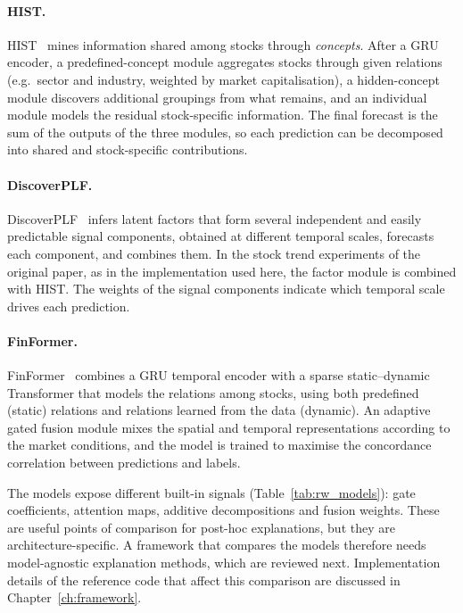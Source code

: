 \paragraph{HIST.} HIST~\cite{xu2021hist} mines information shared among stocks through \emph{concepts}. After a GRU encoder, a predefined-concept module aggregates stocks through given relations (e.g.\ sector and industry, weighted by market capitalisation), a hidden-concept module discovers additional groupings from what remains, and an individual module models the residual stock-specific information. The final forecast is the sum of the outputs of the three modules, so each prediction can be decomposed into shared and stock-specific contributions.

\paragraph{DiscoverPLF.} DiscoverPLF~\cite{hou2024discovering} infers latent factors that form several independent and easily predictable signal components, obtained at different temporal scales, forecasts each component, and combines them. In the stock trend experiments of the original paper, as in the implementation used here, the factor module is combined with HIST. The weights of the signal components indicate which temporal scale drives each prediction.

\paragraph{FinFormer.} FinFormer~\cite{zu2023finformer} combines a GRU temporal encoder with a sparse static--dynamic Transformer that models the relations among stocks, using both predefined (static) relations and relations learned from the data (dynamic). An adaptive gated fusion module mixes the spatial and temporal representations according to the market conditions, and the model is trained to maximise the concordance correlation between predictions and labels.

The models expose different built-in signals (Table~\ref{tab:rw_models}): gate coefficients, attention maps, additive decompositions and fusion weights. These are useful points of comparison for post-hoc explanations, but they are architecture-specific. A framework that compares the models therefore needs model-agnostic explanation methods, which are reviewed next. Implementation details of the reference code that affect this comparison are discussed in Chapter~\ref{ch:framework}.

